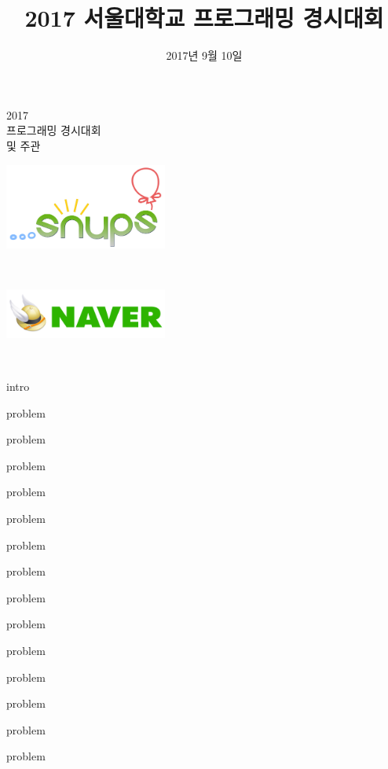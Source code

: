 \documentclass[11pt,a4paper,oneside,final]{article}
\title{2017 서울대학교 프로그래밍 경시대회}
\date{2017년 9월 10일}
\begin{document}
\begin{titlepage}
\begin{center}

\vspace*{3cm}

\textsc{\Huge2017}\\[0.5cm]
\textsc{ 프로그래밍 경시대회}\\[2cm]

\vspace{2cm}
\textsc{ 및 주관}\\[0.0cm]

\begin{center}
\includegraphics[width=0.4\textwidth]{snups.png}
\end{center}

\vspace{1cm}
\textsc{}\\[0.0cm]

\begin{center}
\includegraphics[width=0.4\textwidth]{naver.jpg}
\end{center}

\vspace{1cm}
\textsc{\Large \THEDATE}\\[0.5cm]

\vspace*{\fill}

\end{center}
\end{titlepage}

{intro}

{problem}

{problem}

{problem}

{problem}

{problem}

{problem}

{problem}

{problem}

{problem}

{problem}

{problem}

{problem}

{problem}

{problem}
\end{document}
